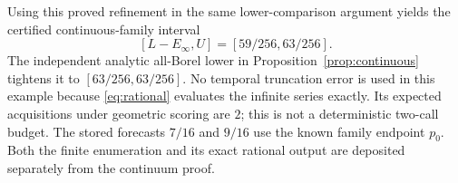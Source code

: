 Using this proved refinement in the same lower-comparison argument yields the certified continuous-family interval
\[
 [L-E_\infty,U]=[59/256,63/256].
\]
The independent analytic all-Borel lower in Proposition~\ref{prop:continuous} tightens it to $[63/256,63/256]$. No temporal truncation error is used in this example because \eqref{eq:rational} evaluates the infinite series exactly. Its expected acquisitions under geometric scoring are $2$; this is not a deterministic two-call budget. The stored forecasts $7/16$ and $9/16$ use the known family endpoint $p_0$. Both the finite enumeration and its exact rational output are deposited separately from the continuum proof.
